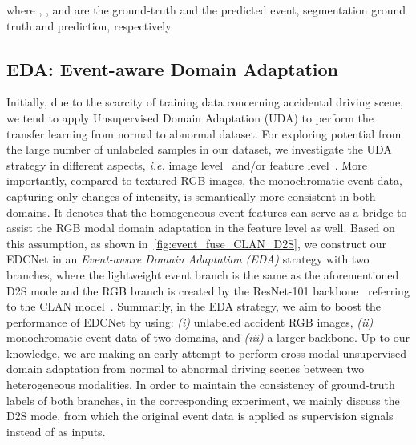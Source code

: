 \documentclass[journal]{IEEEtran}
\begin{document}
where , ,  and  are the ground-truth and the predicted event, segmentation ground truth and prediction, respectively. 



\subsection{EDA: Event-aware Domain Adaptation}
Initially, due to the scarcity of training data concerning accidental driving scene, we tend to apply Unsupervised Domain Adaptation (UDA) to perform the transfer learning from normal to abnormal dataset. For exploring potential from the large number of unlabeled samples in our dataset, we investigate the UDA strategy in different aspects, \textit{i.e.} image level~\cite{zhu2017cycleGAN} and/or feature level~\cite{luo2019CLAN}. More importantly, compared to textured RGB images, the monochromatic event data, capturing only changes of intensity, is semantically more consistent in both domains. It denotes that the homogeneous event features can serve as a bridge to assist the RGB modal domain adaptation in the feature level as well. Based on this assumption, as shown in~\cref{fig:event_fuse_CLAN_D2S}, we construct our EDCNet in an \emph{Event-aware Domain Adaptation (EDA)} strategy with two branches, where the lightweight event branch is the same as the aforementioned D2S mode and the RGB branch is created by the ResNet-101 backbone~\cite{he2016resnet} referring to the CLAN model~\cite{luo2019CLAN}. Summarily, in the EDA strategy, we aim to boost the performance of EDCNet by using: \textit{(i)} unlabeled accident RGB images, \textit{(ii)} monochromatic event data of two domains, and \textit{(iii)} a larger backbone. Up to our knowledge, we are making an early attempt to perform cross-modal unsupervised domain adaptation from normal to abnormal driving scenes between two heterogeneous modalities. In order to maintain the consistency of ground-truth labels of both branches, in the corresponding experiment, we mainly discuss the D2S mode, from which the original event data is applied as supervision signals instead of as inputs.
\end{document}
